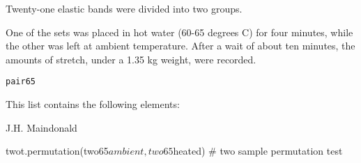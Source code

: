 \begin{Description}\relax
Twenty-one elastic bands were divided into two groups.

One of the sets was placed in hot water (60-65 degrees C) for four
minutes, while the other was left at ambient temperature.  After
a wait of about ten minutes, the amounts of stretch, under a 1.35 kg
weight, were recorded.
\end{Description}
\begin{Usage}
\begin{verbatim}pair65\end{verbatim}
\end{Usage}
\begin{Format}\relax
This list contains the following elements:
\end{Format}
\begin{Source}\relax
J.H. Maindonald
\end{Source}
\begin{Examples}
\begin{ExampleCode}
twot.permutation(two65$ambient,two65$heated) # two sample permutation test
\end{ExampleCode}
\end{Examples}

